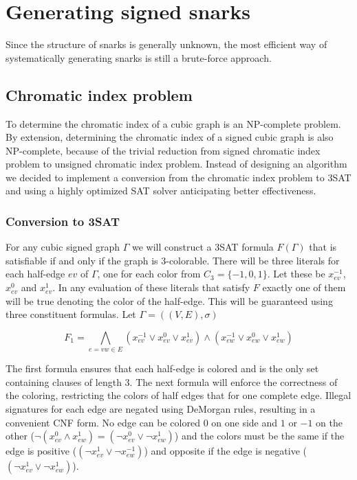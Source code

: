 \chapter{Generating signed snarks}

Since the structure of snarks is generally unknown, the most efficient way of systematically generating snarks is still a brute-force approach.

\section{Chromatic index problem}

To determine the chromatic index of a cubic graph is an NP-complete problem. By extension, determining the chromatic index of a signed cubic graph is also NP-complete, because of the trivial reduction from signed chromatic index problem to unsigned chromatic index problem. Instead of designing an algorithm we decided to implement a conversion from the chromatic index problem to 3SAT and using a highly optimized SAT solver anticipating better effectiveness.

\subsection{Conversion to 3SAT}

For any cubic signed graph $\Gamma$ we will construct a 3SAT formula $F(\Gamma)$ that is satisfiable if and only if the graph is 3-colorable. There will be three literals for each half-edge $ev$ of $\Gamma$, one for each color from $C_3 = \{-1, 0, 1\}$. Let these be $x^{-1}_{ev}$, $x^{0}_{ev}$ and $x^{1}_{ev}$. In any evaluation of these literals that satisfy $F$ exactly one of them will be true denoting the color of the half-edge. This will be guaranteed using three constituent formulas. Let $\Gamma = ((V, E), \sigma)$

$$F_1 = \bigwedge _{e = vw \in E} (x^{-1}_{ev} \vee x^{0}_{ev} \vee x^{1}_{ev}) \wedge (x^{-1}_{ew} \vee x^{0}_{ew} \vee x^{1}_{ew}) $$

The first formula ensures that each half-edge is colored and is the only set containing clauses of length 3. The next formula will enforce the correctness of the coloring, restricting the colors of half edges that for one complete edge. Illegal signatures for each edge are negated using DeMorgan rules, resulting in a convenient CNF form. No edge can be colored $0$ on one side and $1$ or $-1$ on the other ($\neg (x^{0}_{ev} \land x^{1}_{ew}) = (\neg x^{0}_{ev} \lor \neg x^{1}_{ew})$) and the colors must be the same if the edge is positive ($(\neg x^{1}_{ev} \lor \neg x^{-1}_{ew})$) and opposite if the edge is negative ($(\neg x^{1}_{ev} \lor \neg x^{1}_{ew})$).

